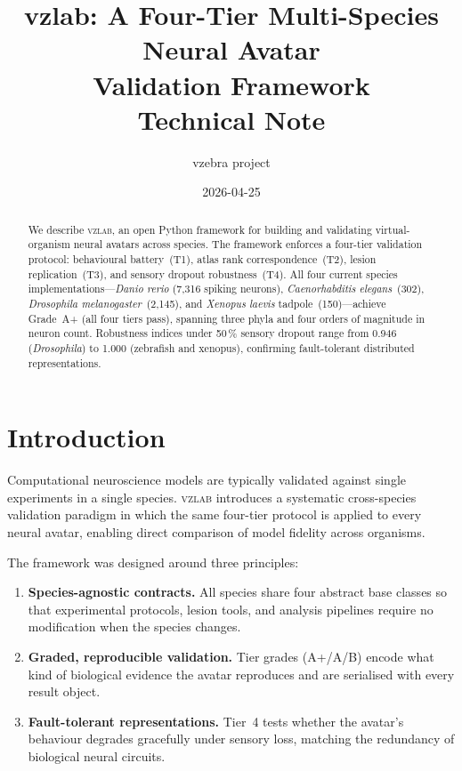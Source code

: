 \documentclass[11pt,a4paper]{article}
\title{\textbf{vzlab: A Four-Tier Multi-Species Neural Avatar\\Validation Framework}\\[6pt]
  \large Technical Note}
\author{vzebra project}
\date{2026-04-25}
\begin{document}
\maketitle

\begin{abstract}
We describe \textsc{vzlab}, an open Python framework for building and
validating virtual-organism neural avatars across species.
The framework enforces a four-tier validation protocol: behavioural
battery~(T1), atlas rank correspondence~(T2), lesion replication~(T3),
and sensory dropout robustness~(T4).
All four current species implementations---\textit{Danio rerio}
(7,316 spiking neurons), \textit{Caenorhabditis elegans}~(302),
\textit{Drosophila melanogaster}~(2,145), and \textit{Xenopus laevis}
tadpole~(150)---achieve Grade~A+ (all four tiers pass), spanning three
phyla and four orders of magnitude in neuron count.
Robustness indices under 50\,\% sensory dropout range from 0.946
(\textit{Drosophila}) to 1.000 (zebrafish and xenopus), confirming
fault-tolerant distributed representations.
\end{abstract}

\section{Introduction}

Computational neuroscience models are typically validated against
single experiments in a single species.
\textsc{vzlab} introduces a systematic cross-species validation
paradigm in which the same four-tier protocol is applied to every
neural avatar, enabling direct comparison of model fidelity across
organisms.

The framework was designed around three principles:
\begin{enumerate}
  \item \textbf{Species-agnostic contracts.}  All species share four
    abstract base classes so that experimental protocols, lesion tools,
    and analysis pipelines require no modification when the species
    changes.
  \item \textbf{Graded, reproducible validation.}  Tier grades
    (A+/A/B) encode what kind of biological evidence the avatar
    reproduces and are serialised with every result object.
  \item \textbf{Fault-tolerant representations.}  Tier~4 tests whether
    the avatar's behaviour degrades gracefully under sensory loss,
    matching the redundancy of biological neural circuits.
\end{enumerate}
\end{document}
